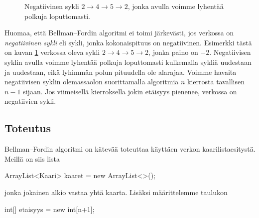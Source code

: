 \begin{figure}
\center
\begin{center}
\end{center}
\caption{Negatiivinen sykli $2 \rightarrow 4 \rightarrow 5 \rightarrow 2$,
jonka avulla voimme lyhentää polkuja loputtomasti.}
\label{fig:belsyk}
\end{figure}

Huomaa, että Bellman–Fordin algoritmi ei toimi järkevästi,
jos verkossa on \emph{negatiivinen sykli}
eli sykli, jonka kokonaispituus on negatiivinen.
Esimerkki tästä on kuvan \ref{fig:belsyk} verkossa oleva sykli
$2 \rightarrow 4 \rightarrow 5 \rightarrow 2$, jonka paino on $-2$.
Negatiivisen syklin avulla voimme lyhentää polkuja loputtomasti kulkemalla
sykliä uudestaan ja uudestaan, eikä lyhimmän polun pituudella ole alarajaa.
Voimme havaita negatiivisen syklin olemassaolon suorittamalla
algoritmia $n$ kierrosta tavallisen $n-1$ sijaan.
Jos viimeisellä kierroksella jokin etäisyys pienenee,
verkossa on negatiivien sykli.

\subsection{Toteutus}

Bellman–Fordin algoritmi on kätevää toteuttaa käyttäen verkon
kaarilista\-esitystä. Meillä on siis lista

\begin{code}
ArrayList<Kaari> kaaret = new ArrayList<>();
\end{code}

jonka jokainen alkio vastaa yhtä kaarta.
Lisäksi määrittelemme taulukon

\begin{code}
int[] etaisyys = new int[n+1];
\end{code}

